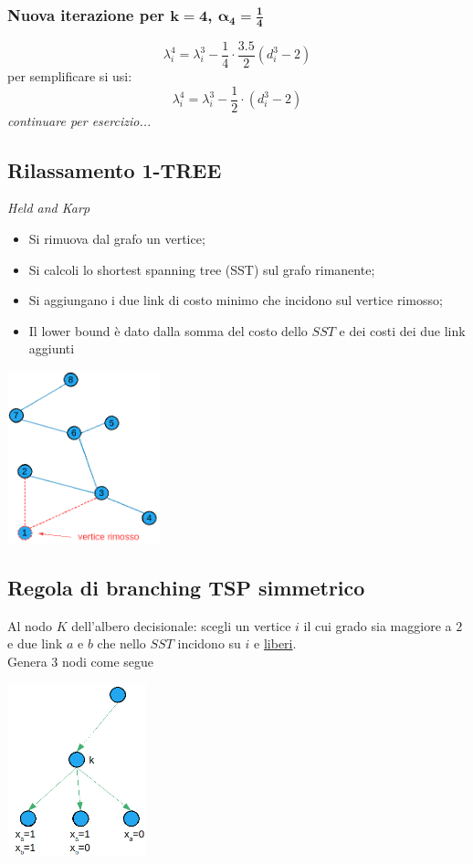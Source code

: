 \subsubsection{Nuova iterazione per $\boldsymbol{k=4}$, $\boldsymbol{\alpha_{4}=\frac{1}{4}}$}
\begin{equation*}
	\lambda_{i}^{4}=\lambda_{i}^{3}-\frac{1}{4}\cdot\frac{3.5}{2}(d_{i}^{3}-2)
\end{equation*}
per semplificare si usi:
\begin{equation*}
	\lambda_{i}^{4}=\lambda_{i}^{3}-\frac{1}{2}\cdot(d_{i}^{3}-2)
\end{equation*}
\textit{continuare per esercizio...}

\clearpage
\subsection{Rilassamento 1-TREE}
\textit{Held and Karp}
\begin{itemize}
	\item Si rimuova dal grafo un vertice;
	\item Si calcoli lo shortest spanning tree (SST) sul grafo rimanente;
	\item Si aggiungano i due link di costo minimo che incidono sul vertice rimosso;
	\item Il lower bound è dato dalla somma del costo dello $SST$ e dei costi dei due link aggiunti
\end{itemize}
\centerline{\includegraphics[height=5cm]{images/graph35.png}}
\subsection{Regola di branching TSP simmetrico}
Al nodo $K$ dell'albero decisionale: scegli un vertice $i$ il cui grado sia maggiore a $2$ e due link $a$ e $b$ che nello $SST$ incidono su $i$ e \underline{liberi}.\\
Genera $3$ nodi come segue

\centerline{\includegraphics[height=5cm]{images/graph36.png}}
